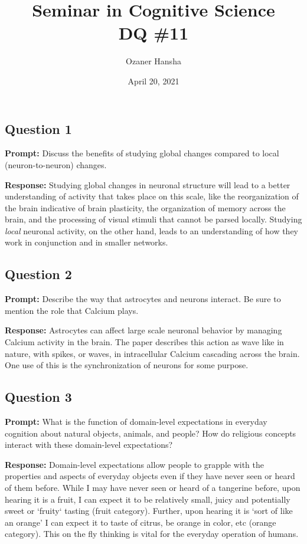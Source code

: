 \documentclass{article}
\begin{document}
\title{Seminar in Cognitive Science\\ DQ \#11}
\author{Ozaner Hansha}
\date{April 20, 2021}
\maketitle

\subsection*{Question 1}
\noindent\textbf{Prompt:} Discuss the benefits of studying global changes compared to local (neuron-to-neuron) changes.
\bigskip

\noindent\textbf{Response:} Studying global changes in neuronal structure will lead to a better understanding of activity that takes place on this scale, like the reorganization of the brain indicative of brain plasticity, the organization of memory across the brain, and the processing of visual stimuli that cannot be parsed locally. Studying \textit{local} neuronal activity, on the other hand, leads to an understanding of how they work in conjunction and in smaller networks. 

\subsection*{Question 2}
\noindent\textbf{Prompt:} Describe the way that astrocytes and neurons interact. Be sure to mention the role that Calcium plays.
\bigskip

\noindent\textbf{Response:} Astrocytes can affect large scale neuronal behavior by managing Calcium activity in the brain. The paper describes this action as wave like in nature, with spikes, or waves, in intracellular Calcium cascading across the brain. One use of this is the synchronization of neurons for some purpose.  

\subsection*{Question 3}
\noindent\textbf{Prompt:} What is the function of domain-level expectations in everyday cognition about natural objects, animals, and people? How do religious concepts interact with these domain-level expectations? 
\bigskip

\noindent\textbf{Response:} Domain-level expectations allow people to grapple with the properties and aspects of everyday objects even if they have never seen or heard of them before. While I may have never seen or heard of a tangerine before, upon hearing it is a fruit, I can expect it to be relatively small, juicy and potentially sweet or `fruity` tasting (fruit category). Further, upon hearing it is `sort of like an orange' I can expect it to taste of citrus, be orange in color, etc (orange category). This on the fly thinking is vital for the everyday operation of humans.
\end{document}
